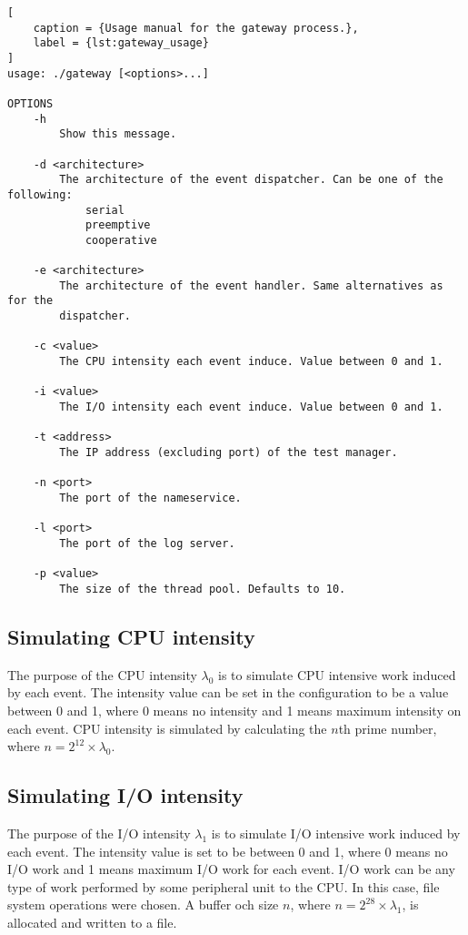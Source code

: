 \begin{lstlisting}[
    caption = {Usage manual for the gateway process.},
    label = {lst:gateway_usage}
]
usage: ./gateway [<options>...]

OPTIONS
    -h
        Show this message.

    -d <architecture>
        The architecture of the event dispatcher. Can be one of the following:
            serial
            preemptive
            cooperative

    -e <architecture>
        The architecture of the event handler. Same alternatives as for the
        dispatcher.

    -c <value>
        The CPU intensity each event induce. Value between 0 and 1.

    -i <value>
        The I/O intensity each event induce. Value between 0 and 1.

    -t <address>
        The IP address (excluding port) of the test manager.

    -n <port>
        The port of the nameservice.

    -l <port>
        The port of the log server.

    -p <value>
        The size of the thread pool. Defaults to 10.
\end{lstlisting}

\subsection{Simulating CPU intensity}

The purpose of the CPU intensity $\lambda_0$ is to simulate CPU intensive work
induced by each event. The intensity value can be set in the configuration to
be a value between 0 and 1, where 0 means no intensity and 1 means maximum
intensity on each event. CPU intensity is simulated by calculating the $n$th
prime number, where $n = 2^{12} \times \lambda_0$.

\subsection{Simulating I/O intensity}

The purpose of the I/O intensity $\lambda_1$ is to simulate I/O intensive work
induced by each event. The intensity value is set to be between 0 and 1, where
0 means no I/O work and 1 means maximum I/O work for each event. I/O work can
be any type of work performed by some peripheral unit to the CPU. In this case,
file system operations were chosen. A buffer och size $n$, where $n = 2^{28}
\times \lambda_1$, is allocated and written to a file.

